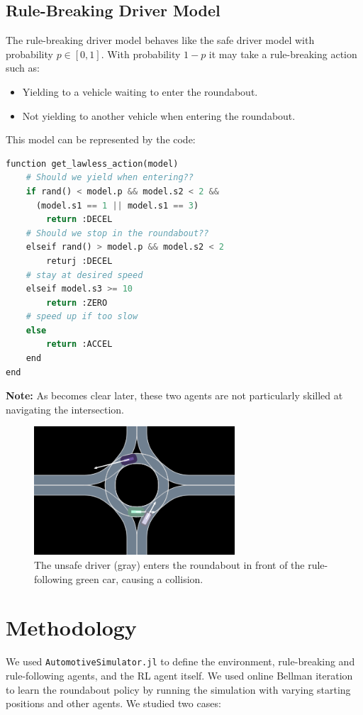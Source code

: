 \documentclass[conference]{IEEEtran}
\begin{document}
\subsection*{Rule-Breaking Driver Model}
The rule-breaking driver model behaves like the safe driver model with probability $p \in [0,1]$. With probability $1-p$ it may take a rule-breaking action such as:
\begin{itemize}
	\item Yielding to a vehicle waiting to enter the roundabout.
	\item Not yielding to another vehicle when entering the roundabout.
\end{itemize}
This model can be represented by the code:
\begin{lstlisting}[language=python]
function get_lawless_action(model)
    # Should we yield when entering??
    if rand() < model.p && model.s2 < 2 &&
      (model.s1 == 1 || model.s1 == 3)
        return :DECEL
    # Should we stop in the roundabout??
    elseif rand() > model.p && model.s2 < 2
        returj :DECEL
    # stay at desired speed
    elseif model.s3 >= 10
        return :ZERO
    # speed up if too slow
    else
        return :ACCEL
    end
end
\end{lstlisting}

\textbf{Note:} As becomes clear later, these two agents are not particularly skilled at navigating the intersection.
\begin{figure}[h!]
	\centering
\includegraphics[width=0.7\linewidth]{figures/unsafe.png}
\caption{The unsafe driver (gray) enters the roundabout in front of the rule-following green car, causing a collision.}
\label{fig:unsafe}
\end{figure}

\section{Methodology}
We used \verb|AutomotiveSimulator.jl| \cite{simulator.jl} to define the environment, rule-breaking and rule-following agents, and the RL agent itself.
We used online Bellman iteration \cite{kochenderfer2022algorithms} to learn the roundabout policy by running the simulation with varying starting positions and other agents.
We studied two cases:
\end{document}
